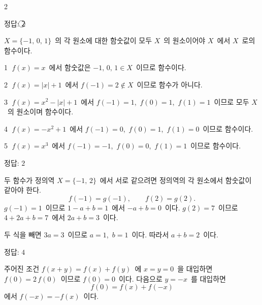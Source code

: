 \documentclass[10pt,fleqn]{article}
\begin{document}
\dmsoltitlefirsttrue
\begin{multicols*}{2}

\begin{dmanswerbox}
정답: \textcircled{\scriptsize 2}
\end{dmanswerbox}

$X = \{-1,\, 0,\, 1\}$\ 의 각 원소에 대한 함숫값이 모두 $X$\ 의 원소이어야 $X$\ 에서 $X$\ 로의 함수이다.

\vspace{3mm}
\textcircled{\scriptsize 1} $f(x) = x$\ 에서 함숫값은 $-1,\, 0,\, 1 \in X$\ 이므로 함수이다.

\vspace{3mm}
\textcircled{\scriptsize 2} $f(x) = |x| + 1$\ 에서 $f(-1) = 2 \notin X$\ 이므로 함수가 아니다.

\vspace{3mm}
\textcircled{\scriptsize 3} $f(x) = x^{2} - |x| + 1$\ 에서 $f(-1) = 1$,\ $f(0) = 1$,\ $f(1) = 1$\ 이므로 모두 $X$\ 의 원소이며 함수이다.

\vspace{3mm}
\textcircled{\scriptsize 4} $f(x) = -x^{2} + 1$\ 에서 $f(-1) = 0$,\ $f(0) = 1$,\ $f(1) = 0$\ 이므로 함수이다.

\vspace{3mm}
\textcircled{\scriptsize 5} $f(x) = x^{3}$\ 에서 $f(-1) = -1$,\ $f(0) = 0$,\ $f(1) = 1$\ 이므로 함수이다.

\begin{dmanswerbox}
정답: $2$
\end{dmanswerbox}

두 함수가 정의역 $X = \{-1,\, 2\}$\ 에서 서로 같으려면 정의역의 각 원소에서 함숫값이 같아야 한다.
\[ f(-1) = g(-1),\qquad f(2) = g(2). \]
$g(-1) = 1$\ 이므로 $1 - a + b = 1$\ 에서 $-a + b = 0$\ 이다. $g(2) = 7$\ 이므로 $4 + 2a + b = 7$\ 에서 $2a + b = 3$\ 이다.

두 식을 빼면 $3a = 3$\ 이므로 $a = 1$,\ $b = 1$\ 이다. 따라서 $a + b = 2$\ 이다.

\begin{dmanswerbox}
정답: $4$
\end{dmanswerbox}

주어진 조건 $f(x + y) = f(x) + f(y)$\ 에 $x = y = 0$\ 을 대입하면 $f(0) = 2\, f(0)$\ 이므로 $f(0) = 0$\ 이다. 다음으로 $y = -x$\ 를 대입하면
\[ f(0) = f(x) + f(-x) \]
에서 $f(-x) = -f(x)$\ 이다.


\end{multicols*}
\end{document}
